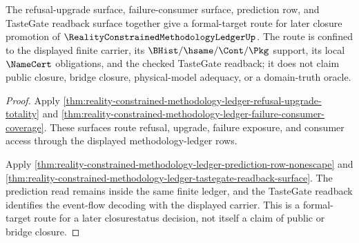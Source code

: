 \begin{theorem}
\label{thm:reality-constrained-methodology-ledger-formal-target-closure-route}
The refusal-upgrade surface, failure-consumer surface, prediction row, and
TasteGate readback surface together give a formal-target route for later
closure promotion of $\RealityConstrainedMethodologyLedgerUp$. The route is
confined to the displayed finite carrier, its $\BHist/\hsame/\Cont/\Pkg$
support, its local $\NameCert$ obligations, and the checked TasteGate readback;
it does not claim public closure, bridge closure, physical-model adequacy, or a
domain-truth oracle.
\end{theorem}
\begin{proof}
Apply
\autoref{thm:reality-constrained-methodology-ledger-refusal-upgrade-totality}
and
\autoref{thm:reality-constrained-methodology-ledger-failure-consumer-coverage}.
These surfaces route refusal, upgrade, failure exposure, and consumer access
through the displayed methodology-ledger rows.

Apply
\autoref{thm:reality-constrained-methodology-ledger-prediction-row-nonescape}
and
\autoref{thm:reality-constrained-methodology-ledger-tastegate-readback-surface}.
The prediction read remains inside the same finite ledger, and the TasteGate
readback identifies the event-flow decoding with the displayed carrier. This
is a formal-target route for a later closurestatus decision, not itself a
claim of public or bridge closure.
\end{proof}
